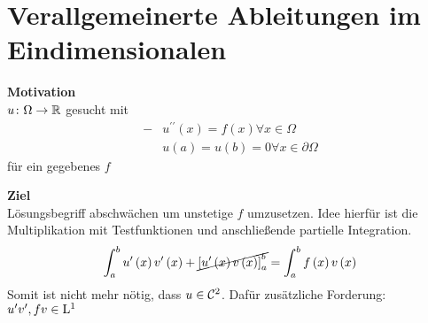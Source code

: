 \section{Verallgemeinerte Ableitungen im Eindimensionalen}

\textbf{Motivation}\\
$u\colon\Omega\to\mathbb{R}$ gesucht mit
\begin{align*}
	-&u^{\prime\prime}\left(x\right) = f\left(x\right) \forall x\in\Omega\\
	 &u\left(a\right) = u\left(b\right) = 0 \forall x\in\partial\Omega
\end{align*}
für ein gegebenes $f$

\textbf{Ziel}\\
Lösungsbegriff abschwächen um unstetige $f$ umzusetzen. Idee hierfür ist die Multiplikation mit Testfunktionen und anschließende partielle Integration.
\begin{equation*}
	\int_{a}^{b} u^{\prime}\left(x\right)v^{\prime}\left(x\right) + \cancel{\left[u^{\prime}\left(x\right)v\left(x\right)\right]_{a}^{b}} = \int_{a}^{b} f\left(x\right)v\left(x\right)
\end{equation*}
Somit ist nicht mehr nötig, dass $u\in\mathcal{C}^{2}$. Dafür zusätzliche Forderung: $u^{\prime}v^{\prime}, fv\in\mathrm{L}^{1}$
